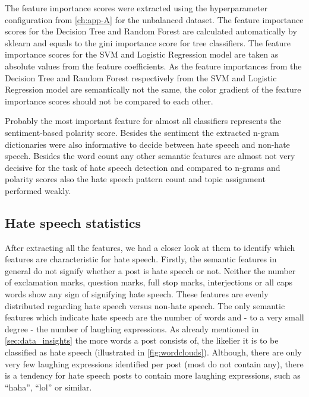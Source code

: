 The feature importance scores were extracted using the hyperparameter configuration from \ref{ch:app-A} for the unbalanced dataset. The feature importance scores for the Decision Tree and Random Forest are calculated automatically by sklearn and equals to the gini importance score for tree classifiers. The feature importance scores for the SVM and Logistic Regression model are taken as absolute values from the feature coefficients. As the feature importances from the Decision Tree and Random Forest respectively from the SVM and Logistic Regression model are semantically not the same, the color gradient of the feature importance scores should not be compared to each other.

Probably the most important feature for almost all classifiers represents the sentiment-based polarity score. Besides the sentiment the extracted n-gram dictionaries were also informative to decide between hate speech and non-hate speech. Besides the word count any other semantic features are almost not very decisive for the task of hate speech detection and compared to n-grams and polarity scores also the hate speech pattern count and topic assignment performed weakly. 

\subsection{Hate speech statistics}
\label{ch:experimentDb}

After extracting all the features, we had a closer look at them to identify which features are characteristic for hate speech.
Firstly, the semantic features in general do not signify whether a post is hate speech or not. Neither the number of exclamation marks, question marks, full stop marks, interjections or all caps words show any sign of signifying hate speech. These features are evenly distributed regarding hate speech versus non-hate speech.
The only semantic features which indicate hate speech are the number of words and - to a very small degree - the number of laughing expressions.
As already mentioned in \autoref{sec:data_insights} the more words a post consists of, the likelier it is to be classified as hate speech (illustrated in \autoref{fig:wordclouds}).
Although, there are only very few laughing expressions identified per post (most do not contain any), there is a tendency for hate speech posts to contain more laughing expressions, such as \enquote{haha}, \enquote{lol} or similar.

\vspace{0.5cm}

